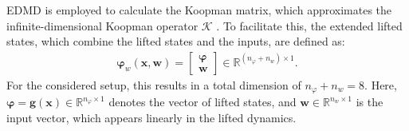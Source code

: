 EDMD is employed to calculate the Koopman matrix, which approximates the infinite-dimensional Koopman operator $\mathcal{K}$ \cite{arbabi2018data}. To facilitate this, the extended lifted states, which combine the lifted states and the inputs, are defined as:
\begin{align}\label{eq:extLiftObs}
    \bm{\varphi}_w(\bm{x},\bm{w}) = 
    \begin{bmatrix}
        \bm{ \varphi}\\ \bm{w}
    \end{bmatrix} \in \mathbb{R}^{(n_\varphi + n_w) \times 1}.
\end{align}
For the considered setup, this results in a total dimension of $n_\varphi + n_w = 8$. Here, $\bm{\varphi} = \bm{g}(\bm{x}) \in \mathbb{R}^{n_\varphi \times 1}$ denotes the vector of lifted states, and $\bm{w} \in \mathbb{R}^{n_w \times 1}$ is the input vector, which appears linearly in the lifted dynamics.

